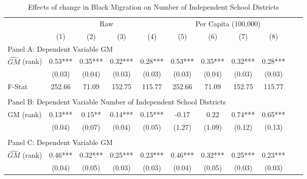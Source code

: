  \begin{table}[htbp]\centering {} \begin{threeparttable} \caption{Effects of change in Black Migration on Number of Independent School Districts} \begin{tabular}{l*{10}{c}} \toprule
                &\multicolumn{4}{c}{Raw}                                    &\multicolumn{4}{c}{Per Capita (100,000)}                   \\\cmidrule(lr){2-5}\cmidrule(lr){6-9}
                &\multicolumn{1}{c}{(1)}   &\multicolumn{1}{c}{(2)}   &\multicolumn{1}{c}{(3)}   &\multicolumn{1}{c}{(4)}   &\multicolumn{1}{c}{(5)}   &\multicolumn{1}{c}{(6)}   &\multicolumn{1}{c}{(7)}   &\multicolumn{1}{c}{(8)}   \\
\cmidrule(lr){1-9}
\multicolumn{8}{l}{Panel A: Dependent Variable GM}\\
\cmidrule(lr){1-9}
$\hat{GM}$ (rank)&       0.53***&       0.35***&       0.32***&       0.28***&       0.53***&       0.35***&       0.32***&       0.28***\\
                &     (0.03)   &     (0.04)   &     (0.03)   &     (0.03)   &     (0.03)   &     (0.04)   &     (0.03)   &     (0.03)   \\
\midrule
F-Stat          &     252.66   &      71.09   &     152.75   &     115.77   &     252.66   &      71.09   &     152.75   &     115.77   \\
\cmidrule[\heavyrulewidth](lr){1-9} \\ \cmidrule[\heavyrulewidth](lr){1-9}
\multicolumn{8}{l}{Panel B: Dependent Variable Number of Independent School Districts}\\
\cmidrule(lr){1-9}
GM  (rank)      &       0.13***&       0.15** &       0.14***&       0.15***&      -0.17   &       0.22   &       0.74***&       0.65***\\
                &     (0.04)   &     (0.07)   &     (0.04)   &     (0.05)   &     (1.27)   &     (1.09)   &     (0.12)   &     (0.13)   \\
\cmidrule[\heavyrulewidth](lr){1-9} \\ \cmidrule[\heavyrulewidth](lr){1-9}
\multicolumn{8}{l}{Panel C: Dependent Variable GM}\\
\cmidrule(lr){1-9}
$\hat{GM}$ (rank)&       0.46***&       0.32***&       0.25***&       0.23***&       0.46***&       0.32***&       0.25***&       0.23***\\
                &     (0.04)   &     (0.05)   &     (0.03)   &     (0.03)   &     (0.04)   &     (0.05)   &     (0.03)   &     (0.03)   \\

\end{tabular}
\end{threeparttable}
\end{table}
